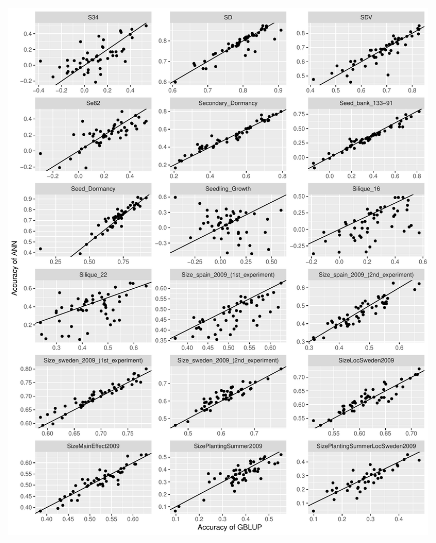 \begin{figure}[H]
  \centering \includegraphics[height=0.99\textheight, width=0.99\textwidth]{Figures/cor_plots_6}
  \decoRule
 \label{fig:bla}
\end{figure}

